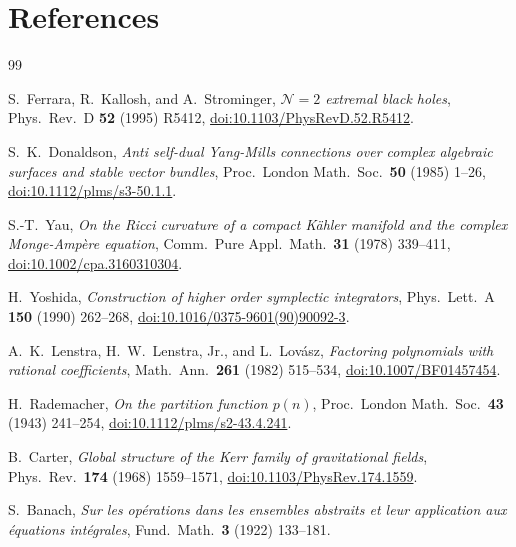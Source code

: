 \documentclass[11pt,a4paper]{article}
\begin{document}
\section*{References}
\begin{thebibliography}{99}

S.~Ferrara, R.~Kallosh, and A.~Strominger,
\emph{$\mathcal{N}=2$ extremal black holes},
Phys.\ Rev.\ D \textbf{52} (1995) R5412,
\href{https://doi.org/10.1103/PhysRevD.52.R5412}{doi:10.1103/PhysRevD.52.R5412}.

S.~K.~Donaldson,
\emph{Anti self-dual Yang-Mills connections over complex algebraic surfaces and stable vector bundles},
Proc.\ London Math.\ Soc.\ \textbf{50} (1985) 1--26,
\href{https://doi.org/10.1112/plms/s3-50.1.1}{doi:10.1112/plms/s3-50.1.1}.

S.-T.~Yau,
\emph{On the Ricci curvature of a compact K\"{a}hler manifold and the complex Monge-Amp\`ere equation},
Comm.\ Pure Appl.\ Math.\ \textbf{31} (1978) 339--411,
\href{https://doi.org/10.1002/cpa.3160310304}{doi:10.1002/cpa.3160310304}.

H.~Yoshida,
\emph{Construction of higher order symplectic integrators},
Phys.\ Lett.\ A \textbf{150} (1990) 262--268,
\href{https://doi.org/10.1016/0375-9601(90)90092-3}{doi:10.1016/0375-9601(90)90092-3}.

A.~K.~Lenstra, H.~W.~Lenstra, Jr., and L.~Lov\'{a}sz,
\emph{Factoring polynomials with rational coefficients},
Math.\ Ann.\ \textbf{261} (1982) 515--534,
\href{https://doi.org/10.1007/BF01457454}{doi:10.1007/BF01457454}.

H.~Rademacher,
\emph{On the partition function $p(n)$},
Proc.\ London Math.\ Soc.\ \textbf{43} (1943) 241--254,
\href{https://doi.org/10.1112/plms/s2-43.4.241}{doi:10.1112/plms/s2-43.4.241}.

B.~Carter,
\emph{Global structure of the Kerr family of gravitational fields},
Phys.\ Rev.\ \textbf{174} (1968) 1559--1571,
\href{https://doi.org/10.1103/PhysRev.174.1559}{doi:10.1103/PhysRev.174.1559}.

S.~Banach,
\emph{Sur les op\'{e}rations dans les ensembles abstraits et leur application aux \'{e}quations int\'{e}grales},
Fund.\ Math.\ \textbf{3} (1922) 133--181.


\end{thebibliography}
\end{document}
